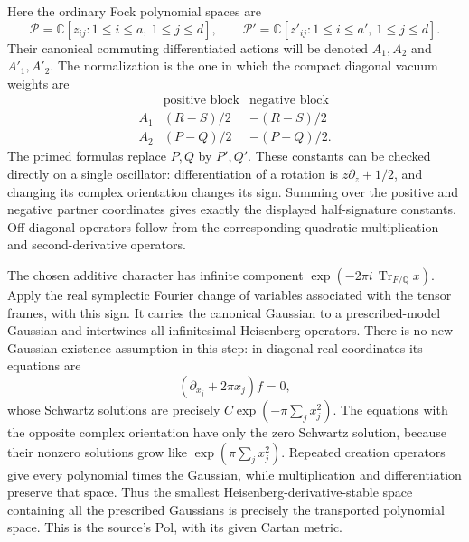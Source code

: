 Here the ordinary Fock polynomial spaces are
\[
 \mathcal P=\mathbb C[z_{ij}:1\le i\le a,\ 1\le j\le d],
 \qquad
 \mathcal P'=\mathbb C[z'_{ij}:1\le i\le a',\ 1\le j\le d].
\]
Their canonical commuting differentiated actions will be denoted
\(A_1,A_2\) and \(A'_1,A'_2\).
The normalization is the one in which the compact diagonal
vacuum weights are
\[
 \begin{array}{c|cc}
   &\text{positive block}&\text{negative block}\\ \hline
 A_1 &(R-S)/2&-(R-S)/2\\
 A_2 &(P-Q)/2&-(P-Q)/2 .
 \end{array}
\]
The primed formulas replace \(P,Q\) by \(P',Q'\).
These constants can be checked directly on a single oscillator:
differentiation of a rotation is \(z\partial_z+1/2\),
and changing its complex orientation changes its sign.
Summing over the positive and negative partner coordinates
gives exactly the displayed half-signature constants.
Off-diagonal operators follow from the corresponding
quadratic multiplication and second-derivative operators.

The chosen additive character has infinite component
\(\exp(-2\pi i\,\operatorname{Tr}_{F/\mathbb Q}x)\).
Apply the real symplectic Fourier change of variables
associated with the tensor frames, with this sign.
It carries the canonical Gaussian to a prescribed-model
Gaussian and intertwines all infinitesimal Heisenberg operators.
There is no new Gaussian-existence assumption in this step:
in diagonal real coordinates its equations are
\[
               (\partial_{x_j}+2\pi x_j)f=0,
\]
whose Schwartz solutions are precisely
\(C\exp(-\pi\sum_jx_j^2)\).
The equations with the opposite complex orientation have
only the zero Schwartz solution, because their nonzero
solutions grow like \(\exp(\pi\sum_jx_j^2)\).
Repeated creation operators give every polynomial times the
Gaussian, while multiplication and differentiation preserve
that space. Thus the smallest Heisenberg-derivative-stable
space containing all the prescribed Gaussians is precisely
the transported polynomial space. This is the source's
\(\mathrm{Pol}\), with its given Cartan metric.

